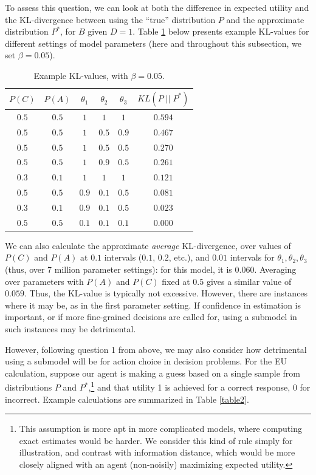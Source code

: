 \documentclass[10pt,letterpaper]{article}
\begin{document}
To assess this question, we can look at both the difference in expected utility and the KL-divergence between using the ``true'' distribution $P$ and the approximate distribution $P^*$, for $B$ given $D=1$. Table \ref{table1} below presents example KL-values for different settings of model parameters (here and throughout this subsection, we set $\beta = 0.05$).

\begin{table}[h]  \begin{center}
\begin{tabular}{c | c | c | c | c || c}
 $P(C)$ & $P(A)$ & $\theta_1$ & $\theta_2$ & $\theta_3$ & $KL(P \;\vert\vert\; P^*)$ \\ \hline
 $0.5$ & $0.5$ & $1$ & $1$ & $1$  & $0.594$ \\
  $0.5$ & $0.5$ & $1$ & $0.5$ & $0.9$  & $0.467$ \\
  $0.5$ & $0.5$ &$1$ & $0.5$ & $0.5$  & $0.270$ \\
 $0.5$ & $0.5$ & $1$ & $0.9$ & $0.5$  & $0.261$ \\
  $0.3$ & $0.1$ & $1$ & $1$ & $1$ & $0.121$ \\
 $0.5$ & $0.5$ &  $0.9$ & $0.1$ & $0.5$  & $0.081$ \\
  $0.3$ & $0.1$ & $0.9$ & $0.1$ & $0.5$ & $0.023$ \\
 $0.5$ & $0.5$ & $0.1$ & $0.1$ & $0.1$ & $0.000$ 
\end{tabular} \end{center} \caption{Example KL-values, with $\beta = 0.05$.} \label{table1}
\end{table}
We can also calculate the approximate \emph{average} KL-divergence, over values of $P(C)$ and $P(A)$ at $0.1$ intervals ($0.1$, $0.2$, etc.), and $0.01$ intervals for $\theta_1,\theta_2,\theta_3$ (thus, over 7 million parameter settings): for this model, it is $0.060$. Averaging over parameters with $P(A)$ and $P(C)$ fixed at $0.5$ gives a similar value of $0.059$.
Thus, the KL-value is typically not excessive. However, there are instances where it may be, as in the first parameter setting. If confidence in estimation is important, or if more fine-grained decisions are called for, using a submodel in such instances may be detrimental. 

However, following question 1 from above, we may also consider how detrimental using a submodel will be for action choice in decision problems.
For the EU calculation, suppose our agent is making a guess based on a single sample from distributions $P$ and $P^*$,\footnote{This assumption is more apt in more complicated models, where computing exact estimates would be harder. We consider this kind of rule simply for illustration, and contrast with information distance, which would be more closely aligned with an agent (non-noisily) maximizing expected utility.} and that utility 1 is achieved for a correct response, 0 for incorrect. Example calculations are summarized in Table \ref{table2}.
\end{document}
